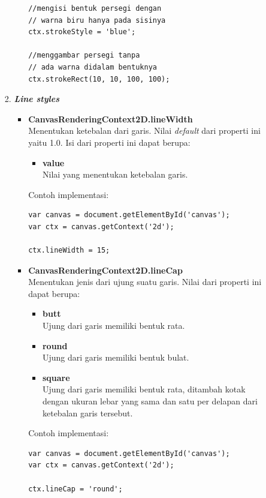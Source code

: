 \documentclass[a4paper,twoside]{article}
\begin{document}
\begin{enumerate}
\begin{enumerate}
\begin{enumerate}
\begin{itemize}
\begin{lstlisting}
//mengisi bentuk persegi dengan
// warna biru hanya pada sisinya
ctx.strokeStyle = 'blue'; 
					
//menggambar persegi tanpa
// ada warna didalam bentuknya
ctx.strokeRect(10, 10, 100, 100);	
\end{lstlisting}
				\end{itemize}
				
				\item \textbf{\textit{Line styles}} \\ 
				\begin{itemize}
					\item \textbf{CanvasRenderingContext2D.lineWidth} \\ Menentukan ketebalan dari garis. Nilai \textit{default} dari properti ini yaitu 1.0. Isi dari properti ini dapat berupa:
					\begin{itemize}
						\item \textbf{value} \\ Nilai yang menentukan ketebalan garis.
					\end{itemize}
					Contoh implementasi:
\begin{lstlisting}
var canvas = document.getElementById('canvas');
var ctx = canvas.getContext('2d');
					
ctx.lineWidth = 15;
\end{lstlisting}
					
					\item \textbf{CanvasRenderingContext2D.lineCap} \\ Menentukan jenis dari ujung suatu garis. Nilai dari properti ini dapat berupa:
					\begin{itemize}
						\item \textbf{butt} \\ Ujung dari garis memiliki bentuk rata.
						\item \textbf{round} \\ Ujung dari garis memiliki bentuk bulat.
						\item \textbf{square} \\ Ujung dari garis memiliki bentuk rata, ditambah kotak dengan ukuran lebar yang sama dan satu per delapan dari ketebalan garis tersebut.
					\end{itemize}
					Contoh implementasi:
\begin{lstlisting}
var canvas = document.getElementById('canvas');
var ctx = canvas.getContext('2d');
					
ctx.lineCap = 'round';
\end{lstlisting}
					

\end{itemize}
\end{enumerate}
\end{enumerate}
\end{enumerate}
\end{document}
